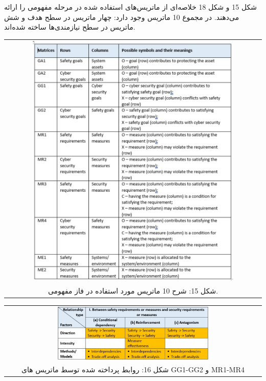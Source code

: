 \documentclass[a4paper,10pt]{article}
\begin{document}
                شکل 15 و شکل 18 خلاصه‌ای از ماتریس‌های استفاده شده در مرحله مفهومی را ارائه می‌دهند. در مجموع 10 ماتریس وجود دارد: چهار ماتریس در سطح هدف و شش ماتریس در سطح نیازمندی‌ها ساخته شده‌اند.

                \begin{table}
            
                    \centering
                    \begin{tabular}{ c }
                        
                        \includegraphics[width=0.8\textwidth]{Image/fig15.jpg} \\
        
                        شکل 15: شرح 10 ماتریس مورد استفاده در فاز مفهومی.

                    \end{tabular}
        
                \end{table}

                \begin{table}
            
                    \centering
                    \begin{tabular}{ c }
                        
                        \includegraphics[width=0.6\textwidth]{Image/fig16.jpg} \\
        
                        شکل 16: روابط پرداخته شده توسط ماتریس های GG1-GG2 و MR1-MR4

                    \end{tabular}
        
                \end{table}
\end{document}
